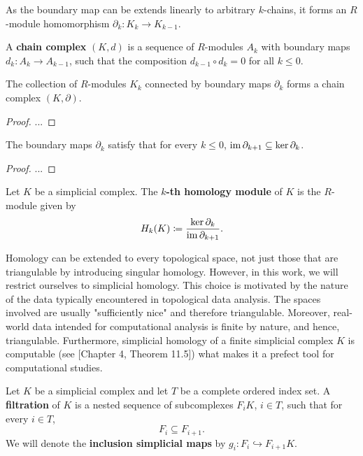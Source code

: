 As the boundary map can be extends linearly to arbitrary $k$-chains, it forms an $R$-module homomorphism $\partial_k \colon K_k \to K_{k-1}$.

\begin{definition}
    A {\bf chain complex} $(K, d)$ is a sequence of $R$-modules $ A_k $ with boundary maps $ d_k \colon A_k \to A_{k-1} $, such that the composition $ d_{k-1} \circ d_k = 0 $ for all $k \leq 0$.
\end{definition}

\begin{lemma}
    The collection of $R$-modules $K_k$ connected by boundary maps $\partial_k$ forms a chain complex $(K, \partial)$.
\end{lemma}
\begin{proof}
    ...
\end{proof}

\begin{corolary}
    The boundary maps $\partial_k$ satisfy that for every $k \leq 0$, $\operatorname{im} \partial_{k+1} \subseteq \ker \partial_k $.
\end{corolary}
\begin{proof}
    ...
\end{proof}

\begin{definition}
    Let $K $ be a simplicial complex. The {\bf $k$-th homology module} of $K$ is the $R$-module given by
    \begin{equation}
        H_k(K) \coloneq \frac{\ker \partial_k}{\operatorname{im} \partial_{k+1}}.
    \end{equation} 
\end{definition}

Homology can be extended to every topological space, not just those that are triangulable by introducing singular homology. However, in this work, we will restrict ourselves to simplicial homology. This choice is motivated by the nature of the data typically encountered in topological data analysis. The spaces involved are usually "sufficiently nice" and therefore triangulable. Moreover, real-world data intended for computational analysis is finite by nature, and hence, triangulable. Furthermore, simplicial homology of a finite simplicial complex $K$ is computable (see \cite{munkres}[Chapter 4, Theorem 11.5]) what makes it a prefect tool for computational studies.

\begin{definition}[Filtration]
    Let $ K $ be a simplicial complex and let $ T $ be a complete ordered index set. A {\bf filtration} of $ K $ is a nested sequence of subcomplexes $ F_i K $, $ i \in T $, such that for every $ i \in T $, 
    \begin{equation}
        F_i \subseteq F_{i+1}.
    \end{equation}
    We will denote the {\bf inclusion simplicial maps} by $ g_i \colon F_i \hookrightarrow F_{i+1} K $.
\end{definition}

